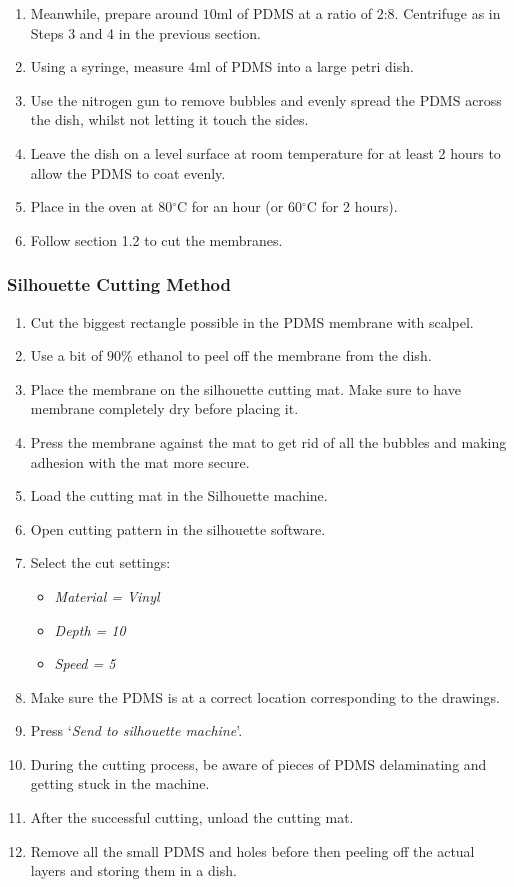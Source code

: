 \begin{enumerate}
	 \setlength\itemsep{-0.1em}
	\item Meanwhile, prepare around $10  \text{ml}$ of PDMS at a ratio of 2:8. Centrifuge as in Steps 3 and 4 in the previous section.
	\item Using a syringe, measure $4  \text{ml}$ of PDMS into a large petri dish.
	\item Use the nitrogen gun to remove bubbles and evenly spread the PDMS across the dish, whilst not letting it touch the sides.
	\item Leave the dish on a level surface at room temperature for at least 2 hours to allow the PDMS to coat evenly.
	\item Place in the oven at 80$^{\circ}$C for an hour (or 60$^{\circ}$C for 2 hours).
	\item Follow section 1.2 to cut the membranes.
\end{enumerate}

\subsubsection{Silhouette Cutting Method}

\begin{enumerate}
		 \setlength\itemsep{-0.1em}
	\setcounter{enumi}{6}
	\item Cut the biggest rectangle possible in the PDMS membrane with scalpel.
	\item Use a bit of $90\%$ ethanol to peel off the membrane from the dish.
	\item Place the membrane on the silhouette cutting mat. Make sure to have membrane completely dry before placing it.
	\item Press the membrane against the mat to get rid of all the bubbles and making adhesion with the mat more secure.
	\item Load the cutting mat in the Silhouette machine.
	\item Open cutting pattern in the silhouette software.
	\item Select the cut settings:
	\begin{itemize}
			 \setlength\itemsep{-0.1em}
		\item \textit{Material = Vinyl}
		\item \textit{Depth = 10}
		\item \textit{Speed = 5}
	\end{itemize}
	\item Make sure the PDMS is at a correct location corresponding to the drawings.
	\item Press `\textit{Send to silhouette machine}'.
	\item During the cutting process, be aware of pieces of PDMS delaminating and getting stuck in the machine.
	\item After the successful cutting, unload the cutting mat.
	\item Remove all the small PDMS and holes before then peeling off the actual layers and storing them in a dish.
\end{enumerate}

